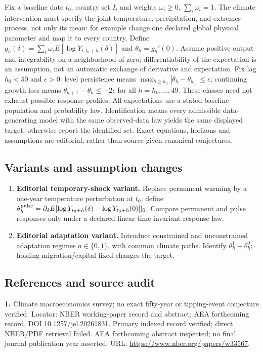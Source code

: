 \documentclass[11pt,a4paper]{article}
\begin{document}
Fix a baseline date \(t_0\), country set \(I\), and weights \(\omega_i\geq0\), \(\sum_i\omega_i=1\). The climate intervention must specify the joint temperature, precipitation, and extremes process, not only its mean: for example change one declared global physical parameter and map it to every country. Define \(g_h(\delta)=\sum_i\omega_iE[\log Y_{i,t_0+h}(\delta)]\) and \(\theta_h=g_h'(0)\). Assume positive output and integrability on a neighborhood of zero; differentiability of the expectation is an assumption, not an automatic exchange of derivative and expectation. Fix lag \(h_0<50\) and \(\epsilon>0\): level persistence means \(\max_{h\geq h_0}|\theta_h-\theta_{h_0}|\leq\epsilon\); continuing growth loss means \(\theta_{h+1}-\theta_h\leq-2\epsilon\) for all \(h=h_0,\ldots,49\). These classes need not exhaust possible response profiles. All expectations use a stated baseline population and probability law. Identification means every admissible data-generating model with the same observed-data law yields the same displayed target; otherwise report the identified set. Exact equations, horizons and assumptions are editorial, rather than source-given canonical conjectures.
\subsection*{Variants and assumption changes}
\begin{enumerate}
\item \textbf{Editorial temporary-shock variant.} Replace permanent warming by a one-year temperature perturbation at \(t_0\); define \(\theta_h^{\rm pulse}=\partial_\delta E[\log Y_{t_0+h}(\delta)-\log Y_{t_0+h}(0)]|_0\). Compare permanent and pulse responses only under a declared linear time-invariant response law.
\item \textbf{Editorial adaptation variant.} Introduce constrained and unconstrained adaptation regimes \(a\in\{0,1\}\), with common climate paths. Identify \(\theta_h^1-\theta_h^0\); holding migration/capital fixed changes the target.
\end{enumerate}
\subsection*{References and source audit}
\textbf{1.} Climate macroeconomics survey; no exact fifty-year or tipping-event conjecture verified. Locator: NBER working-paper record and abstract; AEA forthcoming record, DOI 10.1257/jel.20261831. Primary indexed record verified; direct NBER/PDF retrieval failed. AEA forthcoming abstract inspected; no final journal publication year asserted. URL: \url{https://www.nber.org/papers/w33567}.
\end{document}
